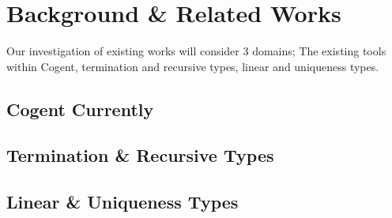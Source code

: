 \chapter{Background \& Related Works}\label{ch:background}

Our investigation of existing works will consider 3 domains; The existing tools within Cogent,
termination and recursive types, linear and uniqueness types.

\section{Cogent Currently}

\section{Termination \& Recursive Types}

\section{Linear \& Uniqueness Types}
